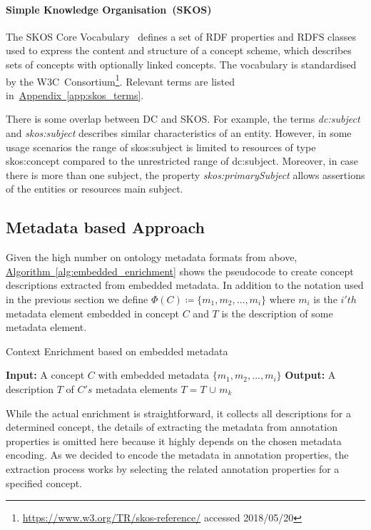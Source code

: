 \paragraph{Simple Knowledge Organisation~(SKOS)}
The SKOS Core Vocabulary~\cite{skos2005} defines a set of RDF properties and RDFS classes
used to express the content and structure of a concept scheme, which describes sets of concepts with optionally linked concepts. The vocabulary is standardised by the W3C~Consortium\footnote{\url{https://www.w3.org/TR/skos-reference/} accessed 2018/05/20}. Relevant terms are listed in~\hyperref[app:skos_terms]{Appendix~\ref*{app:skos_terms}}.
	
There is some overlap between DC and SKOS. For example, the terms \textit{dc:subject} and \textit{skos:subject} describes similar characteristics of an entity. However, in some usage scenarios the range of skos:subject is limited to resources of type skos:concept compared to the unrestricted range of dc:subject. Moreover, in case there is more than one subject, the property \textit{skos:primarySubject} allows assertions of the entities or resources main subject. 


\subsection{Metadata based Approach}\label{sec:enrichment_metaData_approach}
Given the high number on ontology metadata formats from above, \hyperref[alg:embedded_enrichment]{Algorithm~\ref*{alg:embedded_enrichment}} shows the pseudocode to create concept descriptions extracted from embedded metadata. In addition to the notation used in the previous section we define $\Phi(C) \coloneqq \{m_1, m_2, \ldots, m_i \}$ where $m_i$ is the $i'th$ metadata element embedded in concept $C$ and $T$ is the description of some metadata element.

\begin{algorithm}
	\caption{Context Enrichment based on embedded metadata}\label{alg:embedded_enrichment}
	\begin{algorithmic}[1]
		\newline
			\textbf{Input:} A concept $C$ with embedded metadata $\{m_1, m_2, \ldots, m_i \}$\newline
			\textbf{Output:} A description $T$ of $C's$ metadata elements\newline
				\State $T=T$ $\cup$ $m_k$
			\EndFor
		\EndProcedure
	\end{algorithmic}
\end{algorithm}

While the actual enrichment is straightforward, it collects all descriptions for a determined concept, the details of extracting the metadata from annotation properties is omitted here because it highly depends on the chosen metadata encoding.
As we decided to encode the metadata in annotation properties, the extraction process works by selecting the related annotation properties for a specified concept. 
